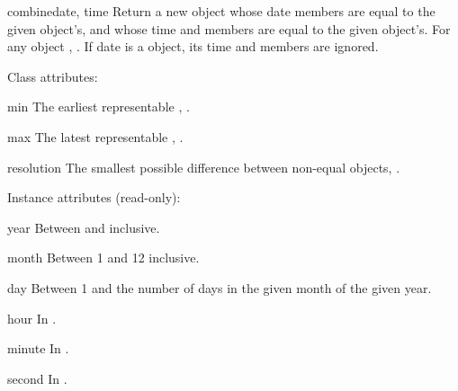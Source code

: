 \begin{methoddesc}{combine}{date, time}
  Return a new  object whose date members are
  equal to the given  object's, and whose time
  and  members are equal to the given  object's.
  For any  object , .  If date is a
   object, its time and  members are
  ignored.
  \end{methoddesc}

Class attributes:

\begin{memberdesc}{min}
  The earliest representable ,
  .
\end{memberdesc}

\begin{memberdesc}{max}
  The latest representable ,
  .
\end{memberdesc}

\begin{memberdesc}{resolution}
  The smallest possible difference between non-equal 
  objects, .
\end{memberdesc}

Instance attributes (read-only):

\begin{memberdesc}{year}
  Between  and  inclusive.
\end{memberdesc}

\begin{memberdesc}{month}
  Between 1 and 12 inclusive.
\end{memberdesc}

\begin{memberdesc}{day}
  Between 1 and the number of days in the given month of the given
  year.
\end{memberdesc}

\begin{memberdesc}{hour}
  In .
\end{memberdesc}

\begin{memberdesc}{minute}
  In .
\end{memberdesc}

\begin{memberdesc}{second}
  In .
\end{memberdesc}

